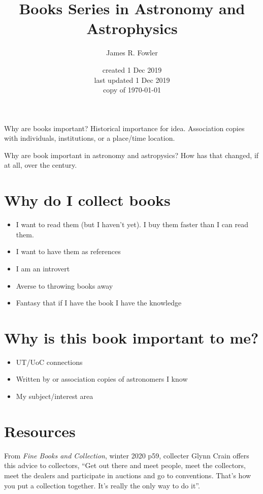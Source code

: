 \documentclass[letterpaper]{article}
\begin{document}
\title{Books Series in Astronomy and Astrophysics}
\author{James R. Fowler}
\date{created 1 Dec 2019\\ last updated 1 Dec 2019\\ copy of \today}

\maketitle

Why are books important? Historical importance for idea. Association
copies with individuals, institutions, or a place/time location.

Why are book important in  astronomy and astropysics? How
has that changed, if at all, over the century.

\section{Why do I collect books}

\begin{itemize}
\item I want to read them (but I haven't yet). I buy them faster than
  I can read them.
\item I want to have them as references
\item I am an introvert
\item Averse to throwing books away
\item Fantasy that if I have the book I have the knowledge
\end{itemize}

\section{Why is this book important to me?}

\begin{itemize}
\item UT/UoC connections
\item Written by or association copies of astronomers I know
\item My subject/interest area
\end{itemize}

\section{Resources}

From {\itshape Fine Books and Collection}, winter 2020 p59, collecter
Glynn Crain offers this advice to collectors, ``Get out there and meet
people, meet the collectors, meet the dealers and participate in
auctions and go to conventions. That's how you put a collection
together. It's really the only way to do it''.
\end{document}
